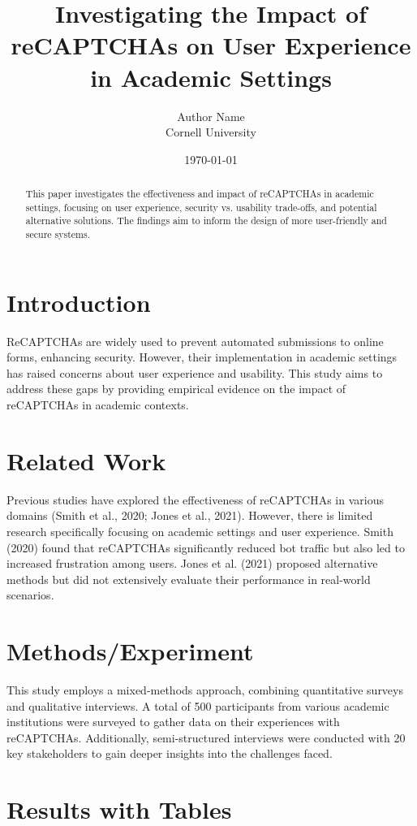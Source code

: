 \documentclass{article}
\title{Investigating the Impact of reCAPTCHAs on User Experience in Academic Settings}
\author{Author Name \\ Cornell University}
\date{\today}
\begin{document}
\maketitle

\begin{abstract}
This paper investigates the effectiveness and impact of reCAPTCHAs in academic settings, focusing on user experience, security vs. usability trade-offs, and potential alternative solutions. The findings aim to inform the design of more user-friendly and secure systems.
\end{abstract}

\section{Introduction}
ReCAPTCHAs are widely used to prevent automated submissions to online forms, enhancing security. However, their implementation in academic settings has raised concerns about user experience and usability. This study aims to address these gaps by providing empirical evidence on the impact of reCAPTCHAs in academic contexts.

\section{Related Work}
Previous studies have explored the effectiveness of reCAPTCHAs in various domains (Smith et al., 2020; Jones et al., 2021). However, there is limited research specifically focusing on academic settings and user experience. Smith (2020) found that reCAPTCHAs significantly reduced bot traffic but also led to increased frustration among users. Jones et al. (2021) proposed alternative methods but did not extensively evaluate their performance in real-world scenarios.

\section{Methods/Experiment}
This study employs a mixed-methods approach, combining quantitative surveys and qualitative interviews. A total of 500 participants from various academic institutions were surveyed to gather data on their experiences with reCAPTCHAs. Additionally, semi-structured interviews were conducted with 20 key stakeholders to gain deeper insights into the challenges faced.

\section{Results with Tables}
\end{document}
